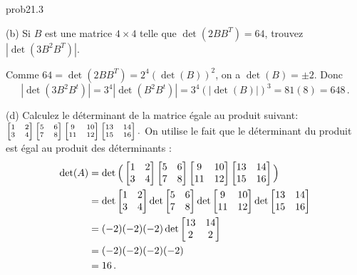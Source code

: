 \bigskip
\begin{sol}{prob21.3} 

 
\medskip
(b) Si $B$ est une matrice $4\times 4$ telle que $\det(2BB^T)=64$, trouvez $|\det(3B^2B^T)|$.

\soln Comme $64=\det (2BB^T)=2^4 (\det(B))^2$, on a $\det(B)=\pm 2$. Donc $$|\det(3B^2B^t)|=3^4|\det(B^2B^t)|=3^4(|\det(B)|)^3=81( 8)=648\,.$$
\medskip


(d) Calculez le d\'eterminant de la matrice égale au produit suivant:
$\scriptsize\bmatrix 1&2\cr3&4 \endbmatrix\bmatrix 5&6\cr7&8\endbmatrix 
\bmatrix9&10\cr11&12\endbmatrix\bmatrix 13&14\cr15&16\endbmatrix.$
\soln On utilise le fait que le déterminant du produit est égal au produit des déterminants :
\begin{equation*}
\begin{split}
\det(A) &=\det\Big(\bmatrix 1&2\cr3&4 \endbmatrix\bmatrix 5&6\cr7&8\endbmatrix 
\bmatrix9&10\cr11&12\endbmatrix\bmatrix 13&14\cr15&16\endbmatrix\Big)\\&= \det \bmatrix 1&2\cr3&4 \endbmatrix \det \bmatrix 5&6\cr7&8\endbmatrix  \det \bmatrix9&10\cr11&12\endbmatrix \det \bmatrix 13&14\cr15&16\endbmatrix\\
&= (-2) (-2) (-2) \det \bmatrix 13&14\cr2&2\endbmatrix\\
&=(-2) (-2) (-2) (-2)\\
&=16\,.
\end{split}\end{equation*}
\medskip


\end{sol}

